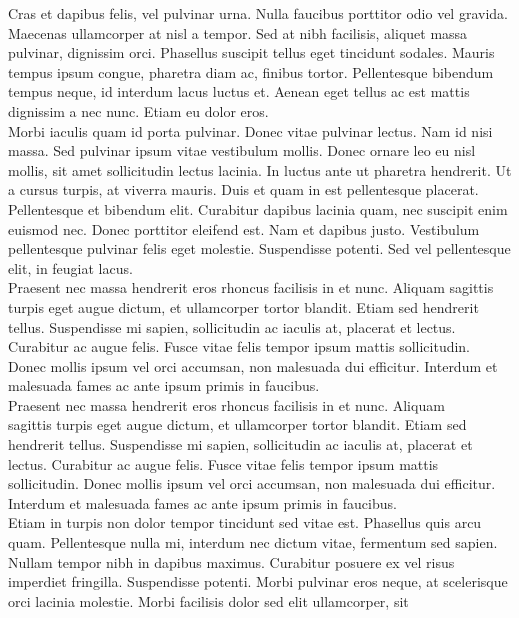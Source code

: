 \documentclass[11pt,a4paper]{article}
\begin{document}
\parindent 0.5cm
Cras et dapibus felis, vel pulvinar urna. Nulla faucibus porttitor odio vel
gravida. Maecenas ullamcorper at nisl a tempor. Sed at nibh facilisis, aliquet
massa pulvinar, dignissim orci. Phasellus suscipit tellus eget tincidunt
sodales. Mauris tempus ipsum congue, pharetra diam ac, finibus tortor. Pellentesque
bibendum tempus neque, id interdum lacus luctus et. Aenean eget
tellus ac est mattis dignissim a nec nunc. Etiam eu dolor eros.
\\
\parindent 0.5cm
Morbi iaculis quam id porta pulvinar. Donec vitae pulvinar lectus. Nam
id nisi massa. Sed pulvinar ipsum vitae vestibulum mollis. Donec ornare leo
eu nisl mollis, sit amet sollicitudin lectus lacinia. In luctus ante ut pharetra
hendrerit. Ut a cursus turpis, at viverra mauris. Duis et quam in est
pellentesque placerat. Pellentesque et bibendum elit. Curabitur dapibus lacinia
quam, nec suscipit enim euismod nec. Donec porttitor eleifend est.
Nam et dapibus justo. Vestibulum pellentesque pulvinar felis eget molestie.
Suspendisse potenti. Sed vel pellentesque elit, in feugiat lacus.
\\
\parindent 0.5cm
Praesent nec massa hendrerit eros rhoncus facilisis in et nunc. Aliquam
sagittis turpis eget augue dictum, et ullamcorper tortor blandit. Etiam sed
hendrerit tellus. Suspendisse mi sapien, sollicitudin ac iaculis at, placerat et
lectus. Curabitur ac augue felis. Fusce vitae felis tempor ipsum mattis sollicitudin.
Donec mollis ipsum vel orci accumsan, non malesuada dui efficitur.
Interdum et malesuada fames ac ante ipsum primis in faucibus.
\\
\parindent 0.5cm
Praesent nec massa hendrerit eros rhoncus facilisis in et nunc. Aliquam
\\
\newpage
sagittis turpis eget augue dictum, et ullamcorper tortor blandit. Etiam sed
hendrerit tellus. Suspendisse mi sapien, sollicitudin ac iaculis at, placerat et
lectus. Curabitur ac augue felis. Fusce vitae felis tempor ipsum mattis sollicitudin.
Donec mollis ipsum vel orci accumsan, non malesuada dui efficitur.
Interdum et malesuada fames ac ante ipsum primis in faucibus.
\\
\parindent 0.5cm
Etiam in turpis non dolor tempor tincidunt sed vitae est. Phasellus quis
arcu quam. Pellentesque nulla mi, interdum nec dictum vitae, fermentum sed
sapien. Nullam tempor nibh in dapibus maximus. Curabitur posuere ex vel
risus imperdiet fringilla. Suspendisse potenti. Morbi pulvinar eros neque, at
scelerisque orci lacinia molestie. Morbi facilisis dolor sed elit ullamcorper, sit
\end{document}
